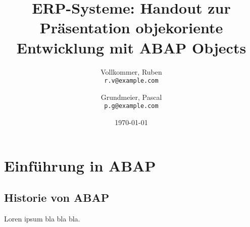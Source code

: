 \documentclass[12pt,a4paper]{scrartcl}
\begin{document}
\title{ERP-Systeme: Handout zur Präsentation objekoriente Entwicklung mit ABAP Objects}

\author{
  Vollkommer, Ruben\\
  \texttt{r.v@example.com}
  \and
  Grundmeier, Pascal\\
  \texttt{p.g@example.com}
}


\date{\today}
\maketitle

\newpage
\tableofcontents
\newpage

\section{Einführung in ABAP}
\subsection{Historie von ABAP}
Loren ipsum bla bla bla.


\end{document}
